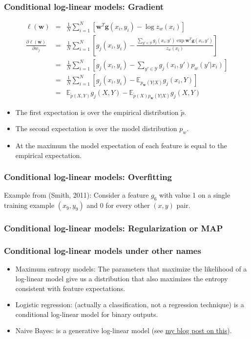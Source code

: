 \documentclass[ignorenonframetext,plain]{beamer}
\begin{document}
\begin{frame}\frametitle{Conditional log-linear models: Gradient}
\begin{eqnarray*}
  \ell(\mathbf{w}) &=& \frac{1}{N} \sum_{i=1}^N \left[ \mathbf{w}^T
    \mathbf{g}(x_i, y_i) - \log z_w(x_i) \right] \\ \frac{\partial
    \ell(\mathbf{w})}{\partial w_j} &=& \frac{1}{N} \sum_{i=1}^N
  \left[ g_j(x_i, y_i) - \frac{\sum_{y'\in\mathcal{Y}} g_j(x_i, y')
      \exp \mathbf{w}^T \mathbf{g}(x_i, y')}{z_w(x_i)} \right] 
  \\ &=& \frac{1}{N} \sum_{i=1}^N \left[ g_j(x_i, y_i) -
    \sum_{y'\in\mathcal{Y}} g_j(x_i, y') p_w(y'|x_i) \right]
  \\ &=& \frac{1}{N} \sum_{i=1}^N \left[ g_j(x_i, y_i) -
    \mathbb{E}_{p_\mathbf{w}(Y|X)} g_j(x_i ,Y) \right]
  \\ &=& \mathbb{E}_{\tilde{p}(X,Y)} g_j(X,Y) -
  \mathbb{E}_{\tilde{p}(X)p_\mathbf{w}(Y|X)} g_j(X,Y)
\end{eqnarray*}
\begin{itemize}
\item The first expectation is over the empirical distribution
  $\tilde{p}$.
\item The second expectation is over the model distribution $p_w$.
\item At the maximum the model expectation of each feature is equal to
  the empirical expectation.
\end{itemize}
\end{frame}

\begin{frame}\frametitle{Conditional log-linear models: Overfitting}
Example from (Smith, 2011): Consider a feature $g_6$ with value 1 on a
single training example $(x_9, y_9)$ and 0 for every other $(x, y)$
pair.
\end{frame}

\begin{frame}\frametitle{Conditional log-linear models: Regularization
    or MAP}

\end{frame}

\begin{frame}\frametitle{Conditional log-linear models under other
    names}
\begin{itemize}
\item Maximum entropy models: The parameters that maximize the
  likelihood of a log-linear model give us a distribution that also
  maximizes the entropy consistent with feature expectations.
\item Logistic regression: (actually a classification, not a
  regression technique) is a conditional log-linear model for binary
  outputs.
\item Naive Bayes: is a generative log-linear model (see
  \href{http://www.denizyuret.com/2010/11/naive-bayes-is-joint-maximum-entropy.html}{my
    blog post on this}).
\end{itemize}
\end{frame}
\end{document}
